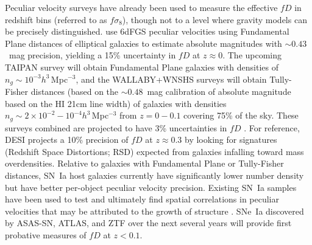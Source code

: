 \documentclass[11pt, oneside]{article}   	%
\begin{document}
Peculiar velocity surveys have already been  used to measure
the effective $fD$ in redshift bins  (referred to as $f\sigma_8$), though not to a level where  gravity models can be precisely distinguished.
 \cite{2017MNRAS.471..839A} use 6dFGS peculiar velocities using  Fundamental Plane distances of elliptical galaxies to estimate absolute magnitudes
 with
 $\sim 0.43$~mag  precision, yielding a 15\% uncertainty in $fD$ at $z\approx 0$.
The upcoming 
TAIPAN survey \cite{2017PASA...34...47D} will obtain Fundamental Plane galaxies with densities of $n_g \sim 10^{-3}h^3$\,Mpc$^{-3}$,
and the WALLABY+WNSHS surveys \cite{2008ExA....22..151J} will obtain Tully-Fisher distances (based on the $\sim 0.48$~mag calibration of absolute magnitude based on the  HI 21cm line width)
of galaxies with densities $n_g \sim 2\times 10^{-2} - 10^{-4} h^3$\,Mpc$^{-3}$ from
$z=0-0.1$ covering 75\% of the sky.
These surveys combined are projected to have 3\% uncertainties in $fD$ \cite{2017MNRAS.464.2517H}.
For reference, DESI projects a 10\% precision of $fD$ at $z \approx 0.3$  by looking 
for signatures (Redshift Space Distortions; RSD) expected from galaxies infalling toward mass overdensities.
Relative to galaxies with  Fundamental Plane or Tully-Fisher distances, 
SN~Ia host galaxies currently have significantly lower number density but have better per-object peculiar velocity precision.
Existing SN~Ia samples
have been used to test and ultimately find spatial correlations in peculiar velocities that may be attributed to the growth of structure
\cite{PhysRevLett.99.081301,2008MNRAS.389L..47A,2014MNRAS.444.3926J,2015JCAP...12..033H, 2017JCAP...05..015H}.
SNe~Ia discovered by ASAS-SN, ATLAS, and ZTF \cite{2014ApJ...788...48S,2018PASP..130f4505T,2019PASP..131a8002B} over the next several years will provide first probative measures of $fD$ at $z<0.1$.
\end{document}
